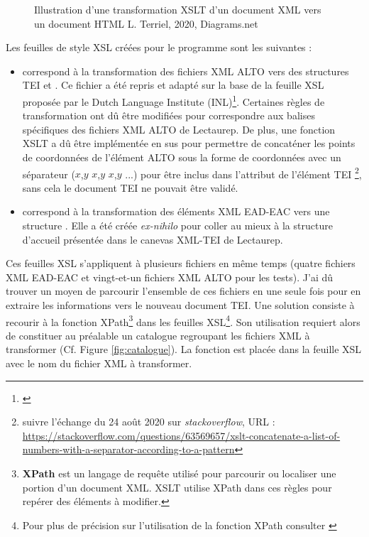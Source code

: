 \begin{figure}[h!]
    \centering
    \centerline{}
    \caption{Illustration d'une transformation XSLT d'un document XML vers un document HTML  \textcopyright L. Terriel, 2020, Diagrams.net}
    \label{fig:example_XSLT}
\end{figure}
\newpage
Les feuilles de style XSL créées pour le programme sont les suivantes : 
\begin{itemize}
    \item {} correspond à la transformation des fichiers XML ALTO vers des structures TEI  et . Ce fichier a été repris et adapté sur la base de la feuille XSL proposée par le Dutch Language Institute (INL)\footnote{\cite{dutch_language_institute_inl_alto2tei_nodate}}. Certaines règles de transformation ont dû être modifiées pour correspondre aux balises spécifiques des fichiers XML ALTO de Lectaurep. De plus, une fonction XSLT a dû être implémentée en sus pour permettre de concaténer les points de coordonnées de l'élément ALTO  sous la forme de coordonnées avec un séparateur ($x$,$y$ $x$,$y$ $x$,$y$ ...)  pour être inclus dans l'attribut  de l'élément TEI \footnote{suivre l'échange du 24 août 2020 sur \textit{stackoverflow}, URL : \url{https://stackoverflow.com/questions/63569657/xslt-concatenate-a-list-of-numbers-with-a-separator-according-to-a-pattern}}, sans cela le document TEI ne pouvait être validé.\\ 
    \item {} correspond à la transformation des éléments XML EAD-EAC vers une structure . Elle a été créée \textit{ex-nihilo} pour coller au mieux à la structure d'accueil présentée dans le canevas XML-TEI de Lectaurep.  
\end{itemize}
\bigskip
Ces feuilles XSL s'appliquent à plusieurs fichiers en même temps (quatre fichiers XML EAD-EAC et vingt-et-un fichiers XML ALTO pour les tests). J'ai dû trouver un moyen de parcourir l'ensemble de ces fichiers en une seule fois pour en extraire les informations vers le nouveau document TEI. Une solution consiste à recourir à la fonction XPath\footnote{\textbf{XPath} est un langage de requête utilisé pour parcourir ou localiser une portion d'un document XML. XSLT utilise XPath dans ces règles pour repérer des éléments à modifier.}  dans les feuilles XSL\footnote{Pour plus de précision sur l'utilisation de la fonction XPath  consulter \cite{holmes_xpath_2013}}. Son utilisation requiert alors de constituer au préalable un catalogue regroupant les fichiers XML à transformer (Cf. Figure \ref{fig:catalogue}). La fonction est placée dans la feuille XSL avec le nom du fichier XML  à transformer. 

